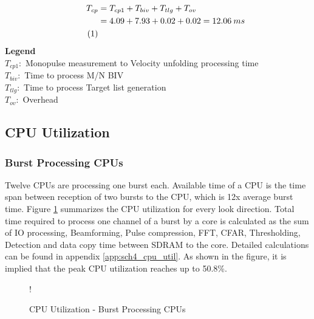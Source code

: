 \begin{align*}
\label{aa:scheme5:corr}
	T_{cp} &= T_{cp1} + T_{biv} + T_{tlg} +T_{ov} \\
	&= 4.09 + 7.93 + 0.02 + 0.02 = 12.06 \: ms \\ \stepcounter{equation}\tag{\theequation} 
\end{align*}
\noindent 
\textbf{Legend}\\
\tab $T_{cp1}:$ Monopulse measurement to Velocity unfolding processing time \\
\tab $T_{biv}:$ Time to process M/N BIV \\
\tab $T_{tlg}:$ Time to process Target list generation \\
\tab $T_{ov}:$ Overhead

\subsection{CPU Utilization}
\label{ss:mm:scheme5:cpu_load}
\subsubsection{Burst Processing CPUs}
Twelve CPUs are processing one burst each. Available time of a CPU is the time span between reception of two bursts to the CPU, which is 12x average burst time. Figure \ref{sch4:chrt:cpu_util} summarizes the CPU utilization for every look direction. Total time required to process one channel of a burst by a core is calculated as the sum of IO processing, Beamforming, Pulse compression, FFT, CFAR, Thresholding, Detection and data copy time between SDRAM to the core. Detailed calculations can be found in appendix \ref{app:sch4_cpu_util}. As shown in the figure, it is implied that the peak CPU utilization reaches up to 50.8\%. 

\begin{figure}[h!]
\centering
\resizebox {10cm} {!} {
}
\caption{CPU Utilization - Burst Processing CPUs}
\label{sch4:chrt:cpu_util}
\end{figure}

